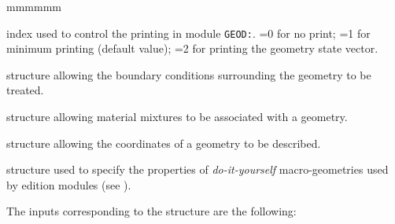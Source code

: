 \begin{ListeDeDescription}{mmmmmm}
\item[\dusa{iprint}] index used to control the printing in module {\tt GEOD:}. =0 for no print; =1 for minimum printing (default value); =2 for printing the geometry state vector.

\item[\dstr{descBC}] structure allowing the boundary conditions surrounding the geometry to be treated.

\item[\dstr{descMC}] structure allowing material mixtures to be associated with a geometry.

\item[\dstr{descPOS}] structure allowing the coordinates of a geometry to be described.

\item[\dstr{descMACRO}] structure used to specify the properties of {\sl do-it-yourself}
macro-geometries used by edition modules (see ).

\end{ListeDeDescription}

The inputs corresponding to the  structure are the following:

